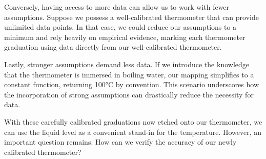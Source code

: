 \begin{bibunit}
Conversely, having access to more data can allow us to work with fewer assumptions. Suppose we possess a well-calibrated thermometer that can provide unlimited data points. In that case, we could reduce our assumptions to a minimum and rely heavily on empirical evidence, marking each thermometer graduation using data directly from our well-calibrated thermometer.

Lastly, stronger assumptions demand less data. If we introduce the knowledge that the thermometer is immersed in boiling water, our mapping simplifies to a constant function, returning 100°C by convention. This scenario underscores how the incorporation of strong assumptions can drastically reduce the necessity for data.

With these carefully calibrated graduations now etched onto our thermometer, we can use the liquid level as a convenient stand-in for the temperature. However, an important question remains: How can we verify the accuracy of our newly calibrated thermometer?

\begin{figure}[h]
\centering
\begin{tabular}{ccc}


\end{tabular}
\end{figure}
\end{bibunit}
